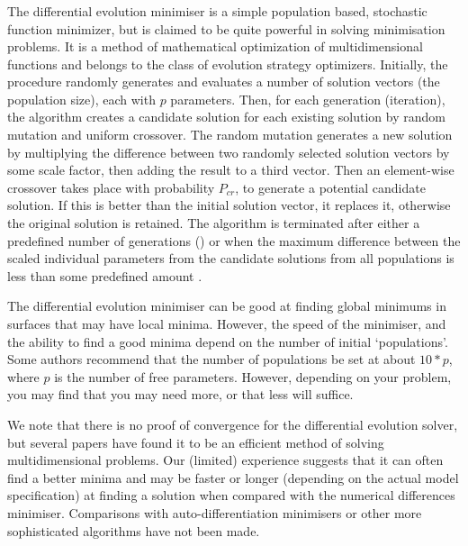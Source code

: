 \subsubsection{}

The differential evolution minimiser is a simple population based, stochastic function minimizer, but is claimed to be quite powerful in solving minimisation problems. It is a method of mathematical optimization of multidimensional functions and belongs to the class of evolution strategy optimizers. Initially, the procedure randomly generates and evaluates a number of solution vectors (the population size), each with $p$ parameters. Then, for each generation (iteration), the algorithm creates a candidate solution for each existing solution by random mutation and uniform crossover. The random mutation generates a new solution by multiplying the difference between two randomly selected solution vectors by some scale factor, then adding the result to a third vector. Then an element-wise crossover takes place with probability $P_{cr}$, to generate a potential candidate solution. If this is better than the initial solution vector, it replaces it, otherwise the original solution is retained. The algorithm is terminated after either a predefined number of generations () or when the maximum difference between the scaled individual parameters from the candidate solutions from all populations is less than some predefined amount .

The differential evolution minimiser can be good at finding global minimums in surfaces that may have local minima. However, the speed of the minimiser, and the ability to find a good minima depend on the number of initial `populations'. Some authors recommend that the number of populations be set at about $10*p$, where $p$ is the number of free parameters. However, depending on your problem, you may find that you may need more, or that less will suffice.

We note that there is no proof of convergence for the differential evolution solver, but several papers have found it to be an efficient method of solving multidimensional problems. Our (limited) experience suggests that it can often find a better minima and may be faster or longer (depending on the actual model specification) at finding a solution when compared with the numerical differences minimiser. Comparisons with auto-differentiation minimisers or other more sophisticated algorithms have not been made. 

